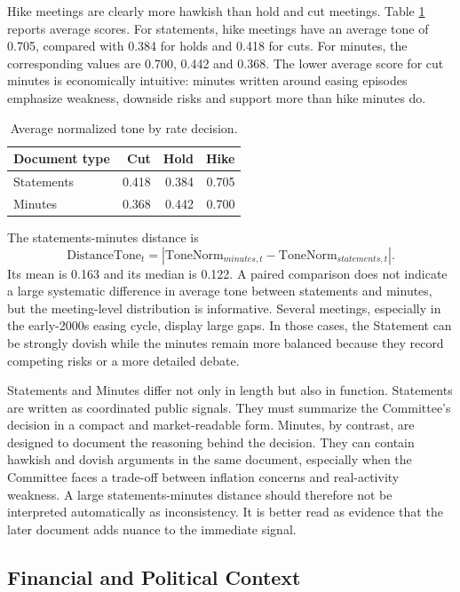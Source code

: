 \documentclass{article}
\begin{document}
Hike meetings are clearly more hawkish than hold and cut meetings. Table
\ref{tab:decision} reports average scores. For statements, hike meetings have an
average tone of 0.705, compared with 0.384 for holds and 0.418 for cuts. For
minutes, the corresponding values are 0.700, 0.442 and 0.368. The lower average
score for cut minutes is economically intuitive: minutes written around easing
episodes emphasize weakness, downside risks and support more than hike minutes do.

\begin{table}[t]
\centering
\caption{Average normalized tone by rate decision.}
\label{tab:decision}
\begin{tabular}{lrrr}
\toprule
Document type & Cut & Hold & Hike \\
\midrule
Statements & 0.418 & 0.384 & 0.705 \\
Minutes & 0.368 & 0.442 & 0.700 \\
\bottomrule
\end{tabular}
\end{table}

The statements-minutes distance is
\begin{equation}
\text{DistanceTone}_{t} =
|\text{ToneNorm}_{minutes,t}-\text{ToneNorm}_{statements,t}|.
\end{equation}
Its mean is 0.163 and its median is 0.122. A paired comparison does not indicate a
large systematic difference in average tone between statements and minutes, but
the meeting-level distribution is informative. Several meetings, especially in
the early-2000s easing cycle, display large gaps. In those cases, the Statement
can be strongly dovish while the minutes remain more balanced because they record
competing risks or a more detailed debate.

Statements and Minutes differ not only in length but also in function. Statements are written as coordinated
public signals. They must summarize the Committee's decision in a compact and
market-readable form. Minutes, by contrast, are designed to document the reasoning
behind the decision. They can contain hawkish and dovish arguments in the same
document, especially when the Committee faces a trade-off between inflation
concerns and real-activity weakness. A large statements-minutes distance should
therefore not be interpreted automatically as inconsistency. It is better read as
evidence that the later document adds nuance to the immediate signal.

\subsection{Financial and Political Context}
\end{document}
